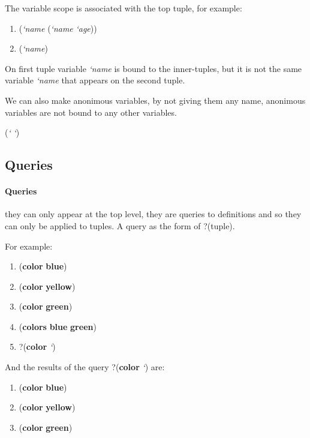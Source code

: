 \documentclass[11pt,a4paper]{report}
\newcommand{\var}[1]{`#1}
\newcommand{\zconst}[1]{\textbf{#1}}
\newcommand{\zvar}[1]{\textit{\var{#1}}}
\newcommand{\ztuple}[1]{(#1)}
\newcommand{\zquery}[1]{?\ztuple{#1}}
\newcommand{\zexample}[1]{\begin{center} #1 \end{center}}
\begin{document}
    The variable scope is associated with the top tuple, for example:
    \zexample{
        \begin{enumerate}
            \item (\zvar{name} (\zvar{name} \zvar{age}))
            \item (\zvar{name})
        \end{enumerate}
    }

    On first tuple variable \zvar{name} is bound to the inner-tuples, but it is not 
    the same variable \zvar{name} that appears on the second tuple.

    We can also make anonimous variables, by not giving them any name, anonimous variables 
    are not bound to any other variables.
    \zexample{(\zvar{} \zvar{})}

\subsection{Queries}
    \paragraph{Queries} they can only appear at the top level, they are queries to definitions and so they can only be applied to tuples.
    A query as the form of \zquery{tuple}.
    
    For example:
        \zexample{
            \begin{enumerate}
                \item (\zconst{color} \zconst{blue})
                \item (\zconst{color} \zconst{yellow})
                \item (\zconst{color} \zconst{green})
                \item (\zconst{colors} \zconst{blue} \zconst{green})
                \item \zquery{\zconst{color} \zvar{}}
            \end{enumerate}
        }
    
    And the results of the query \zquery{\zconst{color} \zvar{}} are:
    \zexample{
        \begin{enumerate}
            \item (\zconst{color} \zconst{blue})
            \item (\zconst{color} \zconst{yellow})
            \item (\zconst{color} \zconst{green})
        \end{enumerate}
    }
\end{document}

